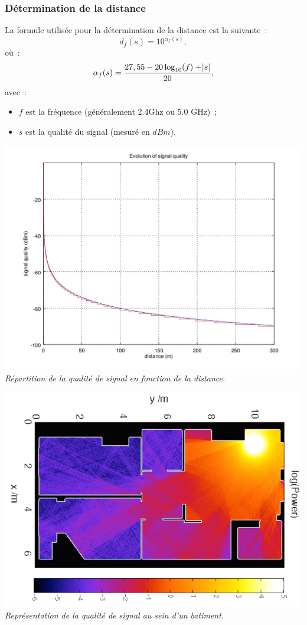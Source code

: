 \documentclass[11pt,a4paper]{article}
\begin{document}
    \subsubsection{Détermination de la distance}
      La formule utilisée pour la détermination de la distance est la suivante~:
      \[d_f(s) = 10^{\alpha_f(s)},\]
      où~:
      \[\alpha_f(s) = \frac{27,55-20\log_{10}(f)+\abs s}{20},\]
        avec~:
      \begin{itemize}
        \item[] $f$ est la fréquence (généralement 2.4Ghz ou 5.0 GHz)~;
        \item[] $s$ est la qualité du signal (mesuré en $dBm$).
      \end{itemize}
      \begin{center}
        \includegraphics[scale=0.5]{signal-propagation.jpg}\\
        \textit{Répartition de la qualité de signal en fonction de la distance.}
      \end{center}
      \begin{center}
        \includegraphics[scale=0.4]{wifi-propagation.png}\\
        \textit{Représentation de la qualité de signal au sein d'un batiment.}
      \end{center}
\end{document}

